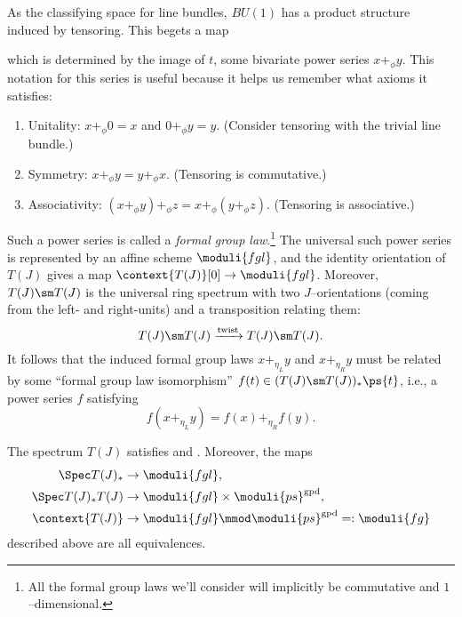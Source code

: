 As the classifying space for line bundles, $BU(1)$ has a product structure induced by tensoring.  This begets a map
\begin{center}
\end{center}
which is determined by the image of $t$, some bivariate power series $x +_\phi y$.  This notation for this series is useful because it helps us remember what axioms it satisfies:
\begin{enumerate}
\item Unitality: $x +_\phi 0 = x$ and $0 +_\phi y = y$.  (Consider tensoring with the trivial line bundle.)
\item Symmetry: $x +_\phi y = y +_\phi x$.  (Tensoring is commutative.)
\item Associativity: $(x +_\phi y) +_\phi z = x +_\phi (y +_\phi z)$.  (Tensoring is associative.)
\end{enumerate}
Such a power series is called a \textit{formal group law}.\footnote{All the formal group laws we'll consider will implicitly be commutative and $1$--dimensional.}  The universal such power series is represented by an affine scheme $\moduli{fgl}$, and the identity orientation of $T(J)$ gives a map $\context{T(J)}[0] \to \moduli{fgl}$.  Moreover, $T(J) \sm T(J)$ is the universal ring spectrum with two $J$--orientations (coming from the left- and right-units) and a transposition relating them: \[T(J) \sm T(J) \xrightarrow{\text{twist}} T(J) \sm T(J).\]  It follows that the induced formal group laws $x +_{\eta_L} y$ and $x +_{\eta_R} y$ must be related by some ``formal group law isomorphism'' $f(t) \in (T(J) \sm T(J))_*\ps{t}$, i.e., a power series $f$ satisfying \[f(x +_{\eta_L} y) = f(x) +_{\eta_R} f(y).\]

\begin{theorem}
The spectrum $T(J)$ satisfies {\FH} and \CH.  Moreover, the maps
\begin{align*}
\Spec T(J)_* & \to \moduli{fgl}, \\
\Spec T(J)_* T(J) & \to \moduli{fgl} \times \moduli{ps}^{\mathrm{gpd}}, \\
\context{T(J)} & \to \moduli{fgl} \mmod \moduli{ps}^{\mathrm{gpd}} =: \moduli{fg}
\end{align*}
described above are all equivalences.
\end{theorem}

